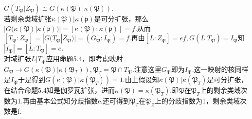 \documentclass[UTF8]{article}
\begin{document}
$G(T_{\mathfrak{P}}|Z_{\mathfrak{P}})\cong G(\kappa(\mathfrak{P})|\kappa(\mathfrak{P})).$ \\
若剩余类域扩张$\kappa(\mathfrak{P})|\kappa(\mathfrak{p})$是可分扩张，那么$|G(\kappa(\mathfrak{P})|\kappa(\mathfrak{p}))|=[\kappa(\mathfrak{P}):\kappa(\mathfrak{p})]=f.$从而$[T_{\mathfrak{P}}:Z_{\mathfrak{P}}]=|G(T_{\mathfrak{P}}|Z_{\mathfrak{P}})|=(G_{\mathfrak{P}}:I_{\mathfrak{P}})=f.$再由$[L:Z_{\mathfrak{P}}]=ef,G(L|T_{\mathfrak{P}})=I_{\mathfrak{P}}$知$|I_{\mathfrak{P}}|=[L:T_{\mathfrak{P}}]=e.$\\
对域扩张$L|T_{\mathfrak{P}}$应用命题5.4，即考虑映射
$G_{\mathfrak{P}}\longrightarrow G(\kappa(\mathfrak{P})|\kappa(\mathfrak{B}_{T})),\mathfrak{P}_{T}=\mathfrak{P}\cap T_{\mathfrak{P}}.$注意这里$G_{\mathfrak{P}}$即为$I_{\mathfrak{P}}.$这一映射的核同样是$I_{\mathfrak{P}}$于是得到$G(\kappa(\mathfrak{P})|\kappa(\mathfrak{P}_{T}))=1.$由上假设知$\kappa(\mathfrak{P})|\kappa(\mathfrak{P}_{T})$是可分扩张，在结合命题5.4知是伽罗瓦扩张，进而$\kappa(\mathfrak{P})=\kappa(\mathfrak{P}_{T}).$即$\mathfrak{P}$在$\mathfrak{P}_{T}$上的剩余类域次数为1.再由基本公式知分歧指数e.还可得到$\mathfrak{P}_{T}$在$\mathfrak{P}_{Z}$上的分歧指数为1，剩余类域次数是f.\\
\end{document}
